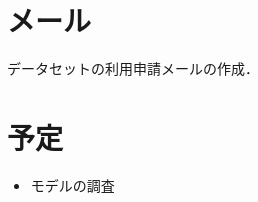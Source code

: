 \documentclass[onecolumn]{ujarticle}   %
\begin{document}
\section{メール}
データセットの利用申請メールの作成．

\section{予定}
\begin{itemize}
  \item モデルの調査
\end{itemize}



% 
% 
\end{document}
